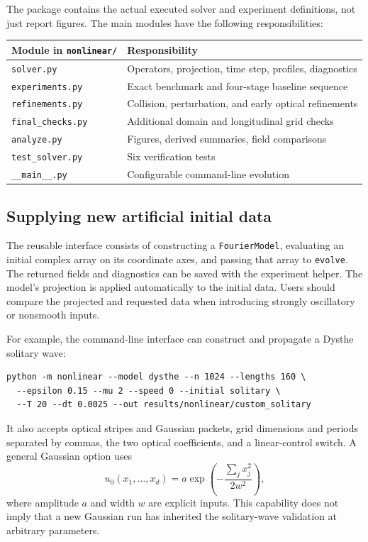 \documentclass[10pt,letterpaper]{article}
\numberwithin{equation}{section}
\begin{document}
The package contains the actual executed solver and experiment definitions, not just report figures. The main modules have the following responsibilities:
\begin{center}\small
\begin{tabular}{ll}\toprule
Module in \texttt{nonlinear/} & Responsibility\\\midrule
\texttt{solver.py} & Operators, projection, time step, profiles, diagnostics\\
\texttt{experiments.py} & Exact benchmark and four-stage baseline sequence\\
\texttt{refinements.py} & Collision, perturbation, and early optical refinements\\
\texttt{final\_checks.py} & Additional domain and longitudinal grid checks\\
\texttt{analyze.py} & Figures, derived summaries, field comparisons\\
\texttt{test\_solver.py} & Six verification tests\\
\texttt{\_\_main\_\_.py} & Configurable command-line evolution\\\bottomrule
\end{tabular}\end{center}

\subsection{Supplying new artificial initial data}
The reusable interface consists of constructing a \texttt{FourierModel}, evaluating an initial complex array on its coordinate axes, and passing that array to \texttt{evolve}. The returned fields and diagnostics can be saved with the experiment helper. The model's projection is applied automatically to the initial data. Users should compare the projected and requested data when introducing strongly oscillatory or nonsmooth inputs.

For example, the command-line interface can construct and propagate a Dysthe solitary wave:
\begin{verbatim}
python -m nonlinear --model dysthe --n 1024 --lengths 160 \
  --epsilon 0.15 --mu 2 --speed 0 --initial solitary \
  --T 20 --dt 0.0025 --out results/nonlinear/custom_solitary
\end{verbatim}
It also accepts optical stripes and Gaussian packets, grid dimensions and periods separated by commas, the two optical coefficients, and a linear-control switch. A general Gaussian option uses
\begin{equation}
 u_0(x_1,\ldots,x_d)=a\exp\left(-\frac{\sum_jx_j^2}{2w^2}\right),
\end{equation}
where amplitude $a$ and width $w$ are explicit inputs. This capability does not imply that a new Gaussian run has inherited the solitary-wave validation at arbitrary parameters.
\end{document}
